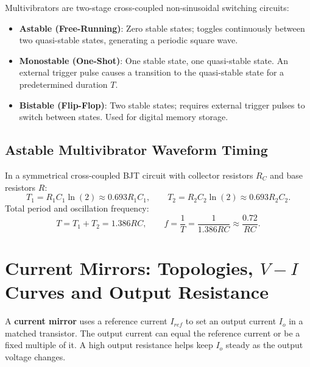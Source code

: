 \documentclass[12pt,a4paper]{article}
\begin{document}
\begin{tcolorbox}[defbox, title={Multivibrator Classification}]
Multivibrators are two-stage cross-coupled non-sinusoidal switching circuits:
\begin{itemize}[leftmargin=1.5em, itemsep=2pt]
  \item \textbf{Astable (Free-Running)}: Zero stable states; toggles continuously between two quasi-stable states, generating a periodic square wave.
  \item \textbf{Monostable (One-Shot)}: One stable state, one quasi-stable state. An external trigger pulse causes a transition to the quasi-stable state for a predetermined duration $T$.
  \item \textbf{Bistable (Flip-Flop)}: Two stable states; requires external trigger pulses to switch between states. Used for digital memory storage.
\end{itemize}
\end{tcolorbox}

\subsection{Astable Multivibrator Waveform Timing}
In a symmetrical cross-coupled BJT circuit with collector resistors $R_C$ and base resistors $R$:
\[
T_1 = R_1 C_1 \ln(2) \approx 0.693 R_1 C_1,\qquad
T_2 = R_2 C_2 \ln(2) \approx 0.693 R_2 C_2.
\]
Total period and oscillation frequency:
\[
T = T_1 + T_2 = 1.386 RC,\qquad f = \frac{1}{T} = \frac{1}{1.386 RC} \approx \frac{0.72}{RC}.
\]

\section{Current Mirrors: Topologies, $V-I$ Curves and Output Resistance}

\begin{tcolorbox}[defbox, title={Current Mirror Concept}]
A \textbf{current mirror} uses a reference current $I_{ref}$ to set an output current $I_o$ in a matched transistor. The output current can equal the reference current or be a fixed multiple of it. A high output resistance helps keep $I_o$ steady as the output voltage changes.
\end{tcolorbox}
\end{document}
